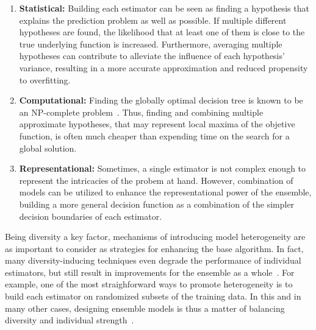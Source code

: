 \begin{enumerate}
    \item \textbf{Statistical:} Building each estimator can be seen as finding a hypothesis that explains the prediction problem as well as possible. If multiple different hypotheses are found, the likelihood that at least one of them is close to the true underlying function is increased. Furthermore, averaging multiple hypotheses can contribute to alleviate the influence of each hypothesis' variance, resulting in a more accurate approximation and reduced propensity to overfitting.
    \item \textbf{Computational:} Finding the globally optimal decision tree is known to be an NP-complete problem~\cite{hyafil1976constructing}. Thus, finding and combining multiple approximate hypotheses, that may represent local maxima of the objetive function, is often much cheaper than expending time on the search for a global solution. %
    \item \textbf{Representational:} Sometimes, a single estimator is not complex enough to represent the intricacies of the probem at hand. However, combination of models can be utilized to enhance the representational power of the ensemble, building a more general decision function as a combination of the simpler decision boundaries of each estimator.  %
\end{enumerate}

Being diversity a key factor,
mechanisms of introducing model heterogeneity are as important to consider as strategies for enhancing the base algorithm.
%
In fact, many diversity-inducing techniques even degrade the performance of individual estimators, but still result in improvements for the ensemble as a whole~\cite{breiman2001random,geurts2006extremely}.
For example, one of the most straighforward ways to promote heterogeneity is to build each estimator on randomized subsets of the training data.
In this and in many other cases, designing ensemble models is thus a matter of balancing diversity and individual strength~\cite{breiman2001random}.


%

